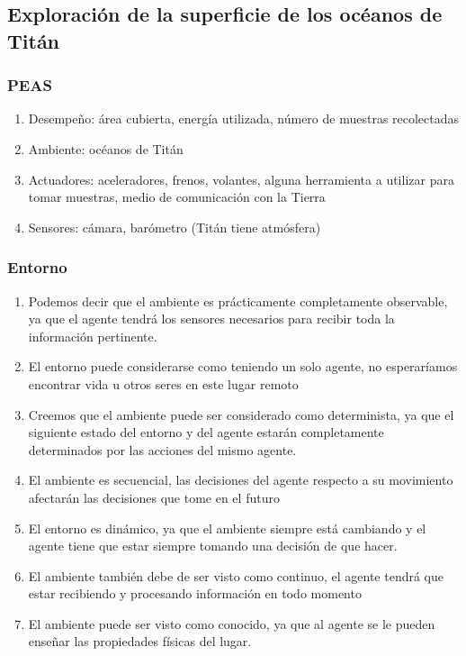 \documentclass{article}
\begin{document}
        \subsection{Exploración de la superficie de los océanos de Titán}

            \subsubsection{PEAS}
                \begin{enumerate}
                    \item Desempeño: área cubierta, energía utilizada, número de muestras recolectadas
                    \item Ambiente: océanos de Titán
                    \item Actuadores: aceleradores, frenos, volantes, alguna herramienta a utilizar para tomar muestras, medio de comunicación con la Tierra
                    \item Sensores: cámara, barómetro (Titán tiene atmósfera)
            \end{enumerate}

            \subsubsection{Entorno}
                \begin{enumerate}
                    \item Podemos decir que el ambiente es prácticamente completamente  observable, ya que el agente tendrá los sensores necesarios para recibir toda la información pertinente.
                    \item El entorno puede considerarse como teniendo un solo agente, no esperaríamos encontrar vida u otros seres en este lugar remoto
                    \item Creemos que el ambiente puede ser considerado como determinista, ya que el siguiente estado del entorno y del agente estarán completamente determinados por las acciones del mismo agente.
                    \item El ambiente es secuencial, las decisiones del agente respecto a su movimiento afectarán las decisiones que tome en el futuro
                    \item El entorno es dinámico, ya que el ambiente siempre está cambiando y el agente tiene que estar siempre tomando una decisión de que hacer. 
                    \item El ambiente también debe de ser visto como continuo, el agente tendrá que estar recibiendo y procesando información en todo momento
                    \item El ambiente puede ser visto como conocido, ya que al agente se le pueden enseñar las propiedades físicas del lugar.
                \end{enumerate}
\end{document}
